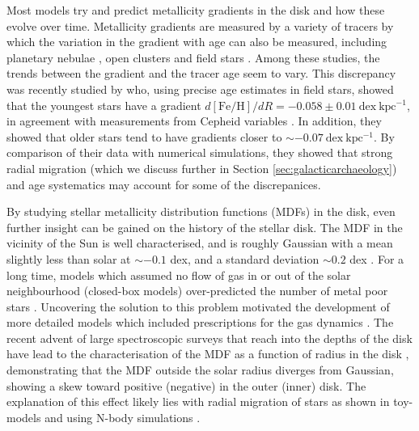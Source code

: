 Most models try and predict metallicity gradients in the disk and how these evolve over time. Metallicity gradients are measured by a variety of tracers by which the variation in the gradient with age can also be measured, including planetary nebulae \citep[e.g.][]{1994A&A...282..436M,1994Ap&SS.219..231M,2010ApJ...714.1096S,2011ApJ...738...27B}, open clusters \citep[e.g.][]{1998MNRAS.296.1045C,2002AJ....124.2693F,2004A&A...414..163S,2009A&A...494...95M,2016AN....337..922C} and field stars \citep[e.g][]{2004A&A...418..989N,2014A&A...566A..37G}. Among these studies, the trends between the \feh{} gradient and the tracer age seem to vary. This discrepancy was recently studied by \citep{2016arXiv160804951A} who, using precise age estimates in field stars, showed that the youngest stars have a gradient $d\mathrm{[Fe/H]}/dR = -0.058\pm 0.01\ \mathrm{dex\ kpc^{-1}}$, in agreement with measurements from Cepheid variables \citep{2014A&A...566A..37G}. In addition, they showed that older stars tend to have gradients closer to $\sim -0.07\ \mathrm{dex\ kpc^{-1}}$. By comparison of their data with numerical simulations, they showed that strong radial migration (which we discuss further in Section \ref{sec:galacticarchaeology}) and age systematics may account for some of the discrepanices.

By studying stellar metallicity distribution functions (MDFs) in the disk, even further insight can be gained on the history of the stellar disk. The MDF in the vicinity of the Sun is well characterised, and is roughly Gaussian with a mean \feh{} slightly less than solar at $\sim -0.1$ dex, and a standard deviation $\sim 0.2$ dex  \citep{1962AJ.....67..486V,2004A&A...418..989N,2011A&A...530A.138C,2012ApJ...761..160S}. For a long time, models which assumed no flow of gas in or out of the solar neighbourhood (closed-box models) over-predicted the number of metal poor stars \citep[the G-dwarf problem, e.g.][]{1963ApJ...137..758S,1975MNRAS.172...13P}. Uncovering the solution to this problem motivated the development of more detailed models which included prescriptions for the gas dynamics \citep[e.g.][]{1972Natur.236...21L,1976MNRAS.176...31L,1977ApJ...216..548T,1980FCPh....5..287T,1989MNRAS.239..885M}. The recent advent of large spectroscopic surveys that reach into the depths of the disk have lead to the characterisation of the MDF as a function of radius in the disk \citep[e.g.][]{2014A&A...564A.115A,2015ApJ...808..132H}, demonstrating that the MDF outside the solar radius diverges from Gaussian, showing a skew toward positive (negative) \feh{} in the outer (inner) disk. The explanation of this effect likely lies with radial migration of stars as shown in toy-models \citep{2015ApJ...808..132H} and using N-body simulations \citep{2016ApJ...818L...6L}.

